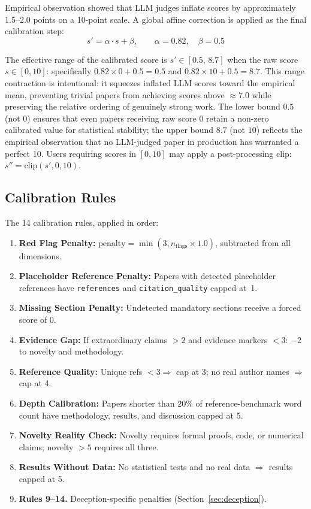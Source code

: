 \documentclass[11pt,a4paper]{article}
\theoremstyle{plain}
\theoremstyle{definition}
\theoremstyle{remark}
\begin{document}
Empirical observation showed that LLM judges inflate scores by approximately 1.5--2.0 points on
a 10-point scale.  A global affine correction is applied as the final calibration step:
\begin{equation}
  s' = \alpha \cdot s + \beta, \qquad \alpha = 0.82,\quad \beta = 0.5
  \label{eq:calibration}
\end{equation}

\begin{correction}
The effective range of the calibrated score is $s' \in [0.5,\, 8.7]$ when the raw score
$s \in [0,10]$: specifically $0.82 \times 0 + 0.5 = 0.5$ and $0.82 \times 10 + 0.5 = 8.7$.
This range contraction is intentional: it squeezes inflated LLM scores toward the empirical mean,
preventing trivial papers from achieving scores above $\approx 7.0$ while preserving the relative
ordering of genuinely strong work.  The lower bound $0.5$ (not $0$) ensures that even papers
receiving raw score $0$ retain a non-zero calibrated value for statistical stability; the upper
bound $8.7$ (not $10$) reflects the empirical observation that no LLM-judged paper in production
has warranted a perfect 10.  Users requiring scores in $[0,10]$ may apply a post-processing clip:
$s'' = \mathrm{clip}(s', 0, 10)$.
\end{correction}

\subsection{Calibration Rules}

The 14 calibration rules, applied in order:
\begin{enumerate}[leftmargin=*]
  \item \textbf{Red Flag Penalty:} $\text{penalty} = \min(3, n_{\text{flags}} \times 1.0)$, subtracted from all dimensions.
  \item \textbf{Placeholder Reference Penalty:} Papers with detected placeholder references have \texttt{references} and \texttt{citation\allowbreak\_quality} capped at~1.
  \item \textbf{Missing Section Penalty:} Undetected mandatory sections receive a forced score of 0.
  \item \textbf{Evidence Gap:} If extraordinary claims $> 2$ and evidence markers $< 3$: $-2$ to novelty and methodology.
  \item \textbf{Reference Quality:} Unique refs $< 3 \Rightarrow$ cap at 3; no real author names $\Rightarrow$ cap at 4.
  \item \textbf{Depth Calibration:} Papers shorter than 20\% of reference-benchmark word count have methodology, results, and discussion capped at 5.
  \item \textbf{Novelty Reality Check:} Novelty requires formal proofs, code, or numerical claims; novelty $> 5$ requires all three.
  \item \textbf{Results Without Data:} No statistical tests and no real data $\Rightarrow$ results capped at 5.
  \item \textbf{Rules 9--14.} Deception-specific penalties (Section~\ref{sec:deception}).
\end{enumerate}
\end{document}
